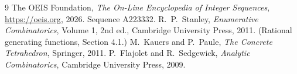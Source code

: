 \documentclass[11pt,a4paper]{article}
\theoremstyle{plain}
\theoremstyle{definition}
\begin{document}
\begin{thebibliography}{9}
 The OEIS Foundation, \emph{The On-Line Encyclopedia of Integer
Sequences}, \url{https://oeis.org}, 2026. Sequence A223332.
 R.~P.~Stanley, \emph{Enumerative Combinatorics}, Volume 1, 2nd ed.,
Cambridge University Press, 2011. (Rational generating functions, Section 4.1.)
 M.~Kauers and P.~Paule, \emph{The Concrete Tetrahedron}, Springer, 2011.
 P.~Flajolet and R.~Sedgewick, \emph{Analytic Combinatorics}, Cambridge
University Press, 2009.
\end{thebibliography}
\end{document}

